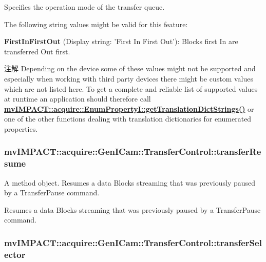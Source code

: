 Specifies the operation mode of the transfer queue.

The following string values might be valid for this feature\+:
\begin{DoxyItemize}
\item {\bfseries First\+In\+First\+Out} (Display string\+: 'First In First Out')\+: Blocks first In are transferred Out first.
\end{DoxyItemize}

\begin{DoxyNote}{注解}
Depending on the device some of these values might not be supported and especially when working with third party devices there might be custom values which are not listed here. To get a complete and reliable list of supported values at runtime an application should therefore call {\bfseries \hyperlink{classmv_i_m_p_a_c_t_1_1acquire_1_1_enum_property_i_a0ba6ccbf5ee69784d5d0b537924d26b6}{mv\+I\+M\+P\+A\+C\+T\+::acquire\+::\+Enum\+Property\+I\+::get\+Translation\+Dict\+Strings()}} or one of the other functions dealing with translation dictionaries for enumerated properties. 
\end{DoxyNote}
\hypertarget{classmv_i_m_p_a_c_t_1_1acquire_1_1_gen_i_cam_1_1_transfer_control_a6077208508f7c213308cdfc89ddc9152}{
\subsubsection[{transfer\+Resume}]{ mv\+I\+M\+P\+A\+C\+T\+::acquire\+::\+Gen\+I\+Cam\+::\+Transfer\+Control\+::transfer\+Resume}}\label{classmv_i_m_p_a_c_t_1_1acquire_1_1_gen_i_cam_1_1_transfer_control_a6077208508f7c213308cdfc89ddc9152}


A method object. Resumes a data Blocks streaming that was previously paused by a Transfer\+Pause command. 

Resumes a data Blocks streaming that was previously paused by a Transfer\+Pause command. \hypertarget{classmv_i_m_p_a_c_t_1_1acquire_1_1_gen_i_cam_1_1_transfer_control_a5f03d183d1ae3ff09fa778c468fae095}{
\subsubsection[{transfer\+Selector}]{ mv\+I\+M\+P\+A\+C\+T\+::acquire\+::\+Gen\+I\+Cam\+::\+Transfer\+Control\+::transfer\+Selector}}\label{classmv_i_m_p_a_c_t_1_1acquire_1_1_gen_i_cam_1_1_transfer_control_a5f03d183d1ae3ff09fa778c468fae095}


